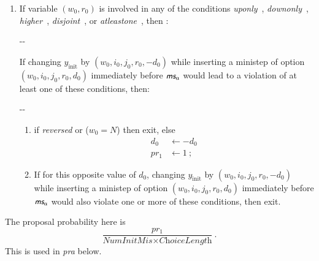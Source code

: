 \documentclass[a4paper,12pt,fleqn]{article}
\makeatletter
\newenvironment{frindentation}[2]
{\par \setlength{\leftmargin}{#1}       \setlength{\rightmargin}{#2}
  \advance\linewidth -\leftmargin       \advance\linewidth -\rightmargin
  \advance\@totalleftmargin\leftmargin  \@setpar{{\@@par}}%
  \parshape 1 \@totalleftmargin         \linewidth \ignorespaces
  \begin{minipage}[h]{\linewidth}\begin{framed}}{\end{framed}\end{minipage}\par}
\newcommand{\nnm}[1]{\textsf{\small\textit{#1}\ }}
\newcommand{\ms}{\textsl{\textsf{\small ms}}} %
\makeatother
\begin{document}
\begin{enumerate}
     $[\nnm{first}.\nnm{succ}, \ms_b]$.\\
     (Thus, $\ms_b$ also is permitted.)\\
     Note that the number of choices here is $\textit{ChoiceLength} \geq 1$.
\newpage
\item If variable $(w_0, r_0)$ is involved in any of the conditions
      \nnm{uponly}, \nnm{downonly}, \nnm{higher}, \nnm{disjoint},
      or \nnm{atleastone}, then :
      \begin{frindentation}{2em}{1em}
      If changing $y_{\text{init}}$
      by $(w_0,i_0,j_0,r_0,-d_0)$ while  inserting a ministep
      of option $(w_0,i_0,j_0,r_0,d_0)$ immediately before $\ms_a$ would
      lead to a violation of at least
      one of these conditions, then:
      \begin{frindentation}{2em}{1em}
        \begin{enumerate}
        \item if \textit{reversed} or ($w_0 = N$) then exit, else
         \begin{align*}
          d_0 & \leftarrow  -d_0 \\
          pr_1 & \leftarrow  1 \ ;
         \end{align*}
        \item If for this opposite value of $d_0$, changing $y_{\text{init}}$
           by $(w_0,i_0,j_0,r_0,-d_0)$ while  inserting a ministep
           of option $(w_0,i_0,j_0,r_0,d_0)$ immediately before $\ms_a$ would also violate
           one or more of these conditions, then exit.
        \end{enumerate}
      \end{frindentation}
      \end{frindentation}
\end{enumerate}
The proposal probability here is
\[
\frac{pr_1}{\textit{NumInitMis} \times \textit{ChoiceLength}} \ .
\]
This is used in \textit{pra} below.
\end{document}

